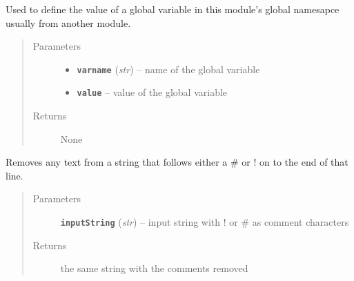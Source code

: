 \documentclass[letterpaper,10pt,english]{sphinxmanual}
\begin{document}

\begin{fulllineitems}
\label{prep:prep.__passGlobalVar}
Used to define the value of a global variable in this module's global namesapce
usually from another module.
\begin{quote}\begin{description}
\item[{Parameters}] \leavevmode\begin{itemize}
\item {} 
\textbf{\texttt{varname}} (\emph{str}) -- name of the global variable

\item {} 
\textbf{\texttt{value}} -- value of the global variable

\end{itemize}

\item[{Returns}] \leavevmode
None

\end{description}\end{quote}

\end{fulllineitems}


\begin{fulllineitems}
\label{prep:prep.__removeComments}
Removes any text from a string that follows either a \# or ! on to the end of
that line.
\begin{quote}\begin{description}
\item[{Parameters}] \leavevmode
\textbf{\texttt{inputString}} (\emph{str}) -- input string with ! or \# as comment characters

\item[{Returns}] \leavevmode
the same string with the comments removed

\end{description}\end{quote}

\end{fulllineitems}

\end{document}
